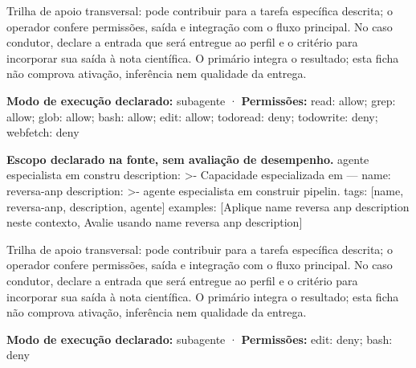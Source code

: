\begin{funcao}
Trilha de apoio transversal: pode contribuir para a tarefa específica descrita; o operador confere permissões, saída e integração com o fluxo principal. No caso condutor, declare a entrada que será entregue ao perfil e o critério para incorporar sua saída à nota científica. O primário integra o resultado; esta ficha não comprova ativação, inferência nem qualidade da entrega.
\end{funcao}

\begin{arquitetura}
\textbf{Modo de execução declarado:} subagente · \textbf{Permissões:} read: allow; grep: allow; glob: allow; bash: allow; edit: allow; todoread: deny; todowrite: deny; webfetch: deny
\end{arquitetura}


\begin{descricao}
\textbf{Escopo declarado na fonte, sem avaliação de desempenho.}
agente especialista em constru description: >- Capacidade especializada em --- name: reversa-anp description: >- agente especialista em construir pipelin. tags: [name, reversa-anp, description, agente] examples: [Aplique name reversa anp description neste contexto, Avalie usando name reversa anp description]
\end{descricao}

\begin{funcao}
Trilha de apoio transversal: pode contribuir para a tarefa específica descrita; o operador confere permissões, saída e integração com o fluxo principal. No caso condutor, declare a entrada que será entregue ao perfil e o critério para incorporar sua saída à nota científica. O primário integra o resultado; esta ficha não comprova ativação, inferência nem qualidade da entrega.
\end{funcao}

\begin{arquitetura}
\textbf{Modo de execução declarado:} subagente · \textbf{Permissões:} edit: deny; bash: deny
\end{arquitetura}


